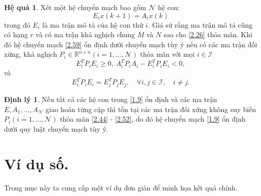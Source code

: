 \documentclass[12pt,a4paper]{report}
\theoremstyle{definition}
\newtheorem{dl}{Định lý}
\newtheorem{corollary}{Hệ quả}
\theoremstyle{definition}
\numberwithin{dl}{chapter}
\numberwithin{vd}{chapter}
\numberwithin{corollary}{chapter}
\numberwithin{lemma}{chapter}
\numberwithin{md}{chapter}
\numberwithin{dn}{chapter}
\numberwithin{cy}{chapter}
\numberwithin{nx}{chapter}
\begin{document}
\begin{corollary}\label{hq2.2} Xét một hệ chuyển mạch bao gồm $\mathcal{N}$ hệ con:
\begin{equation}\label{2.59}
E_{i} x(k+1)=A_{i} x(k) 
\end{equation}
trong đó $E_{i}$ là ma trận mô tả của hệ con thứ $i$. Giả sử rằng ma trận mô tả cũng có hạng $r$ và có ma trận khả nghịch chung $M$ và $N$ sao cho \eqref{2.26} thỏa mãn. Khi đó hệ chuyển mạch \eqref{2.59} ổn định dưới chuyển mạch tùy ý nếu có các ma trận đối xứng, khả nghịch $P_{i} \in \mathbb{R}^{n \times n} (i=1, \ldots, \mathcal{N})$ thỏa mãn với mọi $i \in \mathcal{I}$
\begin{equation}\label{2.60}
E_{i}^{T} P_{i} E_{i} \geq 0,\ A_{i}^{T} P_{i} A_{i}-E_{i}^{T} P_{i} E_{i}<0 ,
\end{equation}
và
\begin{equation}\label{2.61}
E_{i}^{T} P_{i} E_{i}=E_{j}^{T} P_{j} E_{j}, \quad \forall i, j \in \mathcal{I}, \quad i \neq j.
\end{equation}
\end{corollary}
\begin{dl}\label{dl2.4} Nếu tất cả các hệ con trong \eqref{1.9} ổn định và các ma trận $E, A_{1}, \ldots, A_{\mathcal{N}}$ giao hoán từng cặp thì tồn tại các ma trận đối xứng không suy biến $P_{i} (i=1, \ldots, \mathcal{N})$ thỏa mãn \eqref{2.44} - \eqref{2.52}, do đó hệ chuyển mạch \eqref{1.9} ổn định dưới quy luật chuyển mạch tùy ý.
\end{dl}

\section{Ví dụ số.}

Trong mục này ta cung cấp một ví dụ đơn giản để minh họa kết quả chính.
\end{document}
